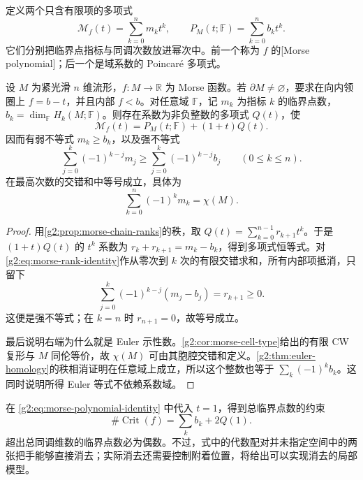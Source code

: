 定义两个只含有限项的多项式
\[
	\mathcal M_f(t)=\sum_{k=0}^n m_kt^k,\qquad
	P_M(t;\mathbb F)=\sum_{k=0}^n b_kt^k.
\]
它们分别把临界点指标与同调次数放进幂次中。前一个称为 \(f\) 的[Morse polynomial]；后一个是域系数的 Poincaré 多项式。

\begin{theorem}\label{g2:thm:morse-inequalities}
	设 \(M\) 为紧光滑 \(n\) 维流形，\(f:M\to\mathbb R\) 为 Morse 函数。若 \(\partial M\ne\varnothing\)，要求在向内领圈上 \(f=b-t\)，并且内部 \(f<b\)。对任意域 \(\mathbb F\)，记 \(m_k\) 为指标 \(k\) 的临界点数，\(b_k=\dim_{\mathbb F}H_k(M;\mathbb F)\)。则存在系数为非负整数的多项式 \(Q(t)\)，使
	\begin{equation}\label{g2:eq:morse-polynomial-identity}
		\mathcal M_f(t)=P_M(t;\mathbb F)+(1+t)Q(t).
	\end{equation}
	因而有弱不等式 \(m_k\ge b_k\)，以及强不等式
	\begin{equation}\label{g2:eq:strong-morse-inequalities}
		\sum_{j=0}^k(-1)^{k-j}m_j
		\ge \sum_{j=0}^k(-1)^{k-j}b_j
		\qquad(0\le k\le n).
	\end{equation}
	在最高次数的交错和中等号成立，具体为
	\begin{equation}\label{g2:eq:morse-euler-equality}
		\sum_{k=0}^n(-1)^km_k=\chi(M).
	\end{equation}
\end{theorem}
\begin{proof}
	用\cref{g2:prop:morse-chain-ranks}的秩，取 \(Q(t)=\sum_{k=0}^{n-1}r_{k+1}t^k\)。于是 \((1+t)Q(t)\) 的 \(t^k\) 系数为 \(r_k+r_{k+1}=m_k-b_k\)，得到多项式恒等式。对\eqref{g2:eq:morse-rank-identity}作从零次到 \(k\) 次的有限交错求和，所有内部项抵消，只留下
	\[
		\sum_{j=0}^k(-1)^{k-j}(m_j-b_j)=r_{k+1}\ge0.
	\]
	这便是强不等式；在 \(k=n\) 时 \(r_{n+1}=0\)，故等号成立。

	最后说明右端为什么就是 Euler 示性数。\cref{g2:cor:morse-cell-type}给出的有限 CW 复形与 \(M\) 同伦等价，故 \(\chi(M)\) 可由其胞腔交错和定义。\cref{g2:thm:euler-homology}的秩相消证明在任意域上成立，所以这个整数也等于 \(\sum_k(-1)^kb_k\)。这同时说明所得 Euler 等式不依赖系数域。
\end{proof}

在 \eqref{g2:eq:morse-polynomial-identity} 中代入 \(t=1\)，得到总临界点数的约束
\[
	\#\operatorname{Crit}(f)=\sum_kb_k+2Q(1).
\]
超出总同调维数的临界点数必为偶数。不过，式中的代数配对并未指定空间中的两张把手能够直接消去；实际消去还需要控制附着位置，将给出可以实现消去的局部模型。

